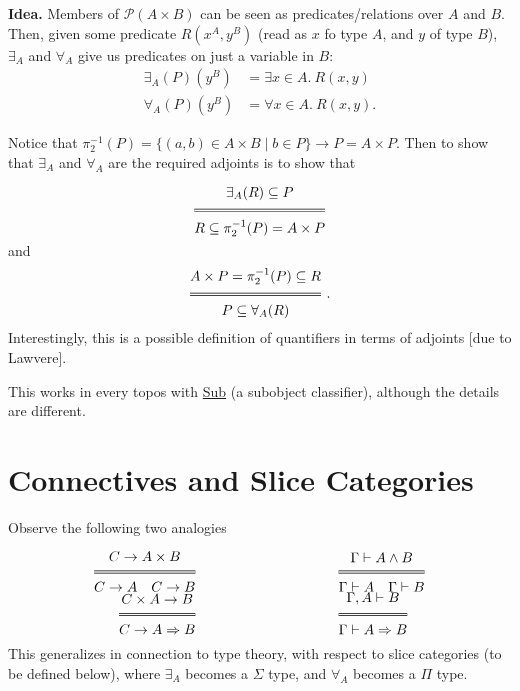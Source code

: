 \begin{example}
\textbf{Idea.} Members of $\mathcal P(A \times B)$ can be seen as predicates/relations
over $A$ and $B$. Then, given some predicate $R(x^A, y^B)$ (read as $x$ fo type $A$, and $y$ of type $B$), $\exists_A$ and
$\forall_A$ give us predicates on just a variable in $B$:
\begin{align*}
  \exists_A(P)(y^B) & = \exists x \in A.~R(x, y) \\
  \forall_A(P)(y^B) & = \forall x \in A.~R(x, y).
\end{align*}

Notice that $\pi_2^{-1}(P) = \{(a, b) \in A \times B \;|\; b \in P\} \longrightarrow
P = A \times P$. Then to show that $\exists_A$ and $\forall_A$ are the required
adjoints is to show that

\[
  \Efrac{\exists_A(R) \subseteq P}{R \subseteq \pi_2^{-1}(P) = A \times P}
\]
and
\[
  \Efrac{A \times P = \pi_2^{-1}(P) \subseteq R}{P \subseteq \forall_A(R)}\;.
\]

Interestingly, this is a possible definition of quantifiers in terms of
adjoints [due to Lawvere].
\end{example}

\begin{remark}
 This works in every topos with \underline{Sub} (a subobject classifier), although the details are different.
\end{remark}

\section{Connectives and Slice Categories}

Observe the following two analogies

\begin{align*}
	\Efrac{C \to A \times B}{C \to A\quad C \to B} &\hspace{10em} \Efrac{\Gamma \vdash A \land B}{\Gamma \vdash A\quad \Gamma \vdash B} \\
	\Efrac{C \times A  \to B}{C \to A \Rightarrow B} &\hspace{10em} \Efrac{\Gamma, A \vdash B}{\Gamma \vdash A \Rightarrow B}
\end{align*}

\begin{remark}
	This generalizes in connection to type theory, with respect to slice categories (to be defined below), where $\exists_A$ becomes a $\Sigma$ type, and $\forall_A$ becomes a $\Pi$ type.
\end{remark}


